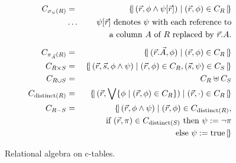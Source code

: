 \begin{figure}[t!]
\begin{center}
\begin{eqnarray*}
C_{\sigma_\psi(R)} &=&
   \bagopen (\vec{r}, \phi \land \psi[\vec{r}]) \mid (\vec{r}, \phi) \in C_R
   \bagclose
\\
&\dots& \mbox{$\psi[\vec{r}]$ denotes $\psi$ with each reference to}
\\
&& \mbox{a column $A$ of $R$ replaced by $\vec{r}.A$.}
\\[1ex]
C_{\pi_{\vec{A}}(R)} &=&
   \bagopen (\vec{r}.\vec{A}, \phi) \mid (\vec{r}, \phi) \in C_R \bagclose
\\
C_{R \times S} &=& \bagopen (\vec{r}, \vec{s}, \phi \land \psi) \mid
   (\vec{r}, \phi) \in C_R, (\vec{s}, \psi) \in C_S \bagclose
\\
C_{R \cup S} &=& C_R \uplus C_S
\\
C_{\mathrm{distinct}(R)} &=&
\bagopen (\vec{r},
    \bigvee \{ \phi \mid (\vec{r}, \phi) \in C_R \} )
    \mid (\vec{r}, \cdot) \in C_R \bagclose
\\
C_{R - S} &=& \bagopen (\vec{r}, \phi \land \psi) \mid
   (\vec{r}, \phi) \in C_{\mathrm{distinct}(R)}, \\
&& \quad\quad
   \mbox{if } (\vec{r}, \pi) \in C_{\mathrm{distinct}(S)} \mbox{ then } \psi := \neg \pi \\
&& \quad\quad
   \mbox{else } \psi := \mbox{true} \bagclose
\end{eqnarray*}

\vspace{-3mm}

\caption{Relational algebra on c-tables.}
\label{fig:ctables-relalg}
\end{center}
\vspace*{-0.25in}
\end{figure}


